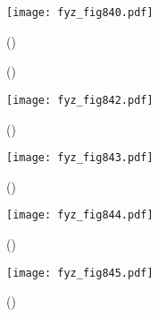     \begin{figure}[ht!] %
      \centering
      \texttt{[image: fyz\_fig840.pdf]}
      \caption{
               (\cite[s.~707]{Feynman02})}
      \label{fyz:fig840}
    \end{figure}
    
    \begin{figure}[ht!] %
      \centering
                     \newline
      \caption{
               (\cite[s.~748]{Feynman02})}
      \label{fyz:fig841}
    \end{figure}

    \begin{figure}[ht!] %
      \centering
      \texttt{[image: fyz\_fig842.pdf]}
      \caption{
               (\cite[s.~707]{Feynman02})}
      \label{fyz:fig842}
    \end{figure}

    \begin{figure}[ht!] %
      \centering
      \texttt{[image: fyz\_fig843.pdf]}
      \caption{
               (\cite[s.~707]{Feynman02})}
      \label{fyz:fig843}
    \end{figure}

    \begin{figure}[ht!] %
      \centering
      \texttt{[image: fyz\_fig844.pdf]}
      \caption{
               (\cite[s.~707]{Feynman02})}
      \label{fyz:fig844}
    \end{figure}

    \begin{figure}[ht!] %
      \centering
      \texttt{[image: fyz\_fig845.pdf]}
      \caption{
               (\cite[s.~707]{Feynman02})}
      \label{fyz:fig845}
    \end{figure}

